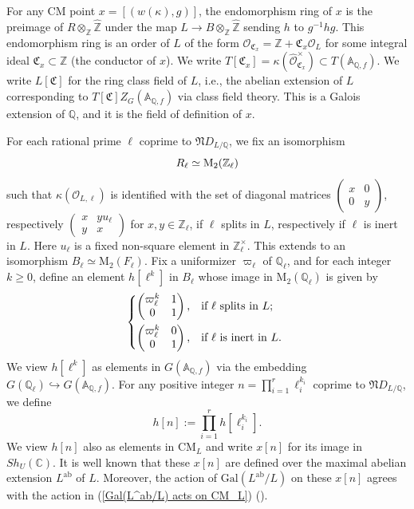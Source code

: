 \documentclass[11pt,oneside,reqno]{amsart}
\newcommand{\Gal}{\mathrm{Gal}}
\newcommand{\ab}{\mathrm{ab}}
\newcommand{\CM}{\mathrm{CM}}
\newcommand{\A}{\mathbb{A}}
\newcommand{\C}{\mathbb{C}}
\newcommand{\Q}{\mathbb{Q}}
\newcommand{\Z}{\mathbb{Z}}
\newcommand{\Ocal}{\mathcal{O}}
\newcommand{\Cfrak}{\mathfrak{C}}
\newcommand{\Nfrak}{\mathfrak{N}}
\theoremstyle{plain}
\begin{document}
	
	
	
	
	
	
	
	For any CM point $x=[(w(\kappa),g)]$, the endomorphism ring of $x$ is the preimage of $R\otimes_\Z\widehat{\Z}$ under the map $L\to B\otimes_\Z\widehat{\Z}$ sending $h$ to $g^{-1}hg$. This endomorphism ring is an order of $L$ of the form $\Ocal_{\Cfrak_x}=\Z+\Cfrak_x\Ocal_L$ for some integral ideal $\Cfrak_x\subset\Z$ (the conductor of $x$). We write $T[\Cfrak_x]=\kappa(\widehat{\Ocal}_{\Cfrak_x}^\times)\subset T(\A_{\Q,f})$. We write $L[\Cfrak]$ for the ring class field of $L$, i.e., the abelian extension of $L$ corresponding to $T[\Cfrak]Z_ G(\A_{\Q,f})$ via class field theory. This is a Galois extension of $\Q$, and it is the field of definition of $x$.
	
	
	For each rational prime $\ell$ coprime to $\Nfrak D_{L/\Q}$, we fix an isomorphism
	\begin{equation}\label{R_ell and M_2(O_{F,ell})}
		R_\ell\simeq\mathrm{M}_2(\Z_\ell)
	\end{equation}
	such that $\kappa(\Ocal_{L,\ell})$ is identified with the set of diagonal matrices $\begin{pmatrix}
		x & 0 \\ 0 & y
	\end{pmatrix}$, respectively $\begin{pmatrix}
		x & yu_\ell \\ y & x
	\end{pmatrix}$ for $x,y\in\Z_\ell$, if $\ell$ splits in $L$, respectively if $\ell$ is inert in $L$. Here $u_\ell$ is a fixed non-square element in $\Z_\ell^\times$.
	This extends to an isomorphism $B_\ell\simeq\mathrm{M}_2(F_\ell)$. Fix a uniformizer $\varpi_\ell$ of $\Q_\ell$, and for each integer $k\ge0$, define an element $h[\ell^k]$ in $B_\ell$ whose image in $\mathrm{M}_2(\Q_\ell)$ is given by
	\[
	\begin{cases*}
		\begin{pmatrix}
			\varpi_\ell^k & 1 \\ 0 & 1
		\end{pmatrix},
		&
		if $\ell$ splits in $L$;
		\\
		\begin{pmatrix}
			\varpi_\ell^k & 0 \\ 0 & 1
		\end{pmatrix},
		&
		if $\ell$ is inert in $L$.
	\end{cases*}
	\]
	We view $h[\ell^k]$ as elements in $G(\A_{\Q,f})$ via the embedding $G(\Q_\ell)\hookrightarrow G(\A_{\Q,f})$. For any positive integer $n=\prod_{i=1}^r\ell_i^{k_i}$ coprime to $\Nfrak D_{L/\Q}$, we define
	\[
	h[n]:=\prod_{i=1}^rh[\ell_i^{k_i}].
	\]
	We view $h[n]$ also as elements in $\CM_L$ and write $x[n]$ for its image in $ Sh_{U}(\C)$.
	It is well known that these $x[n]$ are defined over the maximal abelian extension $L^\ab$ of $L$. Moreover, the action of $\Gal(L^\ab/L)$ on these $x[n]$ agrees with the action in (\ref{Gal(L^ab/L) acts on CM_L}) (\cite[Theorem 1.2.2]{Howard2004b}).
	
\end{document}
